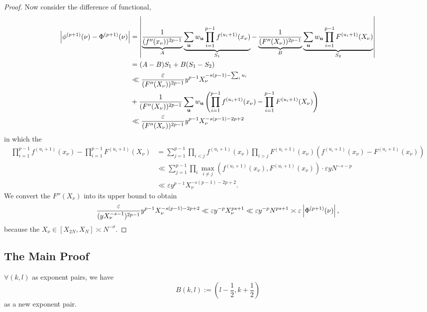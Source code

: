\begin{proof}
Now consider the difference of functional, 
\begin{align}
    \left\lvert \phi^{(p+1)}(\nu) - \Phi^{(p+1)}(\nu) \right\rvert &= \left\lvert \underbrace{\frac{1}{(f''(x_\nu))^{2p-1}}}_A \underbrace{\sum_{\mathbf{u}} w_\mathbf{u} \prod_{i = 1}^{p-1} f^{(u_i+1)}(x_\nu)}_{S_1} - \underbrace{\frac{1}{(F''(X_\nu))^{2p-1}}}_B \underbrace{\sum_{\mathbf{u}} w_\mathbf{u} \prod_{i = 1}^{p-1} F^{(u_i+1)}(X_\nu)}_{S_2} \right\rvert \\
    &= (A-B)S_1 + B(S_1-S_2) \\
    &\ll \frac{\varepsilon}{(F''(X_\nu))^{2p-1}} y^{p-1} X_\nu^{-s(p-1)-\sum_i u_i}  \\ 
    &+ \frac{1}{(F''(X_\nu))^{2p-1}} \sum_{\mathbf{u}} w_\mathbf{u} \left( \prod_{i = 1}^{p-1} f^{(u_i+1)}(x_\nu) - \prod_{i = 1}^{p-1} F^{(u_i+1)}(X_\nu) \right) \\
    &\ll \frac{\varepsilon}{(F''(X_\nu))^{2p-1}} y^{p-1} X_\nu^{-s(p-1)-2p+2}
\end{align}
in which the 
\begin{align}
    \prod_{i = 1}^{p-1} f^{(u_i+1)}(x_\nu) - \prod_{i = 1}^{p-1} F^{(u_i+1)}(X_\nu) &= \sum_{j = 1}^{p-1} \prod_{i < j} f^{(u_i+1)}(x_\nu) \prod_{i > j} F^{(u_i+1)}(x_\nu) (f^{(u_i+1)}(x_\nu) - F^{(u_i+1)}(x_\nu)) \\
    &\ll \sum_{j = 1}^{p-1} \prod_i\max_{i \neq j}(f^{(u_i+1)}(x_\nu), F^{(u_i+1)}(x_\nu)) \cdot \varepsilon yN^{-s-p} \\ 
    &\ll \varepsilon y^{p-1} X_\nu^{-s(p-1)-2p+2}.
\end{align}
We convert the $F''(X_\nu)$ into its upper bound to obtain $$\frac{\varepsilon}{(yX_\nu^{-s-1})^{2p-1}} y^{p-1} X_\nu^{-s(p-1)-2p+2} \ll \varepsilon y^{-p} X_\nu^{ps+1} \ll \varepsilon y^{-p} N^{ps+1} \asymp \varepsilon \left\lvert \Phi^{(p+1)}(\nu) \right\rvert,$$
because the $X_\nu \in [X_{2N}, X_N] \asymp N^{-\sigma}$.
\end{proof}

\subsection*{The Main Proof}

\begin{theorem}
    $\forall (k,l)$ as exponent pairs, we have $$B(k, l) := \left( l - \frac{1}{2}, k + \frac{1}{2} \right)$$ as a new exponent pair.
\end{theorem}

